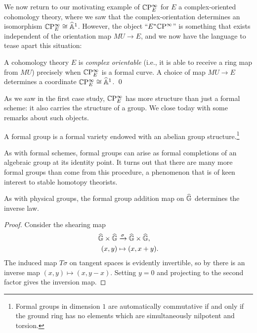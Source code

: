 We now return to our motivating example of $\mathbb{C}\mathrm P^\infty_E$ for $E$ a complex-oriented cohomology theory, where we saw that the complex-orientation determines an isomorphism $\mathbb{C}\mathrm P^\infty_E \cong \widehat{\mathbb{A}}^1$.  However, the object ``$E^* \mathbb{C}\mathrm P^\infty$'' is something that exists independent of the orientation map $MU \to E$, and we now have the language to tease apart this situation:
\begin{lemma}
A cohomology theory $E$ is \textit{complex orientable} (i.e., it is able to receive a ring map from $MU$) precisely when $\mathbb{C}\mathrm P^\infty_E$ is a formal curve.  A choice of map $MU \to E$ determines a coordinate $\mathbb{C}\mathrm P^\infty_E \cong \widehat{\mathbb{A}}^1$. \qed
\end{lemma}

As we saw in the first case study, $\mathbb{C}\mathrm P^\infty_E$ has more structure than just a formal scheme: it also carries the structure of a group.  We close today with some remarks about such objects.

\begin{definition}
A formal group is a formal variety endowed with an abelian group structure.\footnote{Formal groups in dimension $1$ are automatically commutative if and only if the ground ring has no elements which are simultaneously nilpotent and torsion.}
\end{definition}

\begin{remark}
As with formal schemes, formal groups can arise as formal completions of an algebraic group at its identity point.  It turns out that there are many more formal groups than come from this procedure, a phenomenon that is of keen interest to stable homotopy theorists.
\end{remark}

\begin{corollary}
As with physical groups, the formal group addition map on $\widehat{\mathbb G}$ determines the inverse law.
\end{corollary}
\begin{proof}
Consider the shearing map
\begin{align*}
\widehat{\mathbb G} \times \widehat{\mathbb G} & \xrightarrow{\sigma} \widehat{\mathbb G} \times \widehat{\mathbb G}, \\
(x, y) & \mapsto (x, x + y).
\end{align*}
The induced map $T\sigma$ on tangent spaces is evidently invertible, so by  there is an inverse map $(x, y) \mapsto (x, y - x)$.  Setting $y = 0$ and projecting to the second factor gives the inversion map.
\end{proof}

